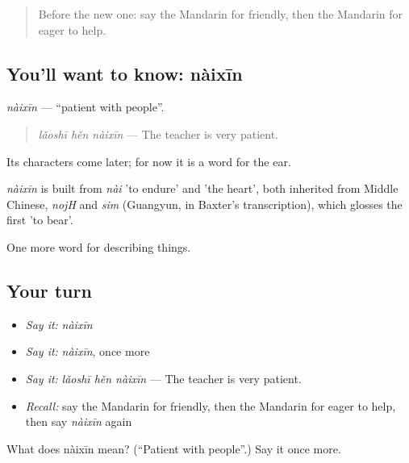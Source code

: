 \label{lesson:ZH-C258-naixin}



\begin{quote}
Before the new one: say the Mandarin for friendly, then the Mandarin for eager to help.
\end{quote}

\subsection*{You'll want to know: nàixīn}
\emph{nàixīn} — \textquotedblleft{}patient with people\textquotedblright{}.

\begin{quote}
\emph{lǎoshī hěn nàixīn} — The teacher is very patient.
\end{quote}

Its characters come later; for now it is a word for the ear.

\begin{cousinweb}
\emph{nàixīn} is built from \emph{nài} 'to endure' and  'the heart', both inherited from Middle Chinese, \emph{nojH} and \emph{sim} (Guangyun, in Baxter's transcription), which glosses the first 'to bear'.
\end{cousinweb}

\begin{grammarlens}[title={What you've built}]
One more word for describing things.
\end{grammarlens}

\subsection*{Your turn}
\begin{itemize}
\raggedright
  \item \emph{Say it:} \emph{nàixīn}
  \item \emph{Say it:} \emph{nàixīn}, once more
  \item \emph{Say it:} \emph{lǎoshī hěn nàixīn} — The teacher is very patient.
  \item \emph{Recall:} say the Mandarin for friendly, then the Mandarin for eager to help, then say \emph{nàixīn} again
\end{itemize}

\begin{tcolorbox}[breakable,colback=teal!4,colframe=teal!35!black,title={Before you move on}]
What does nàixīn mean? (\textquotedblleft{}Patient with people\textquotedblright{}.) Say it once more.
\end{tcolorbox}
